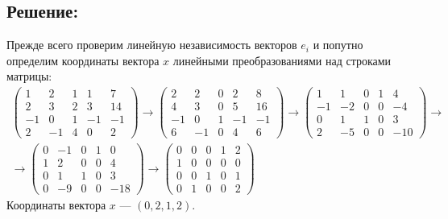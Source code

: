 \documentclass[12pt]{article}
\begin{document}
    \subsection*{Решение:}
    Прежде всего проверим линейную независимость векторов $e_i$ и попутно определим координаты вектора $x$ линейными преобразованиями над строками матрицы:
    \begin{gather*}
        \begin{pmatrix}
            1  & 2  & 1 & 1  & 7  \\
            2  & 3  & 2 & 3  & 14 \\
            -1 & 0  & 1 & -1 & -1 \\
            2  & -1 & 4 & 0  & 2
        \end{pmatrix}
        \rightarrow
        \begin{pmatrix}
            2  & 2  & 0 & 2  & 8  \\
            4  & 3  & 0 & 5  & 16 \\
            -1 & 0  & 1 & -1 & -1 \\
            6  & -1 & 0 & 4  & 6
        \end{pmatrix}
        \rightarrow
        \begin{pmatrix}
            1  & 1  & 0 & 1 & 4   \\
            -1 & -2 & 0 & 0 & -4  \\
            0  & 1  & 1 & 0 & 3   \\
            2  & -5 & 0 & 0 & -10
        \end{pmatrix}
        \rightarrow \\
        \rightarrow
        \begin{pmatrix}
            0 & -1 & 0 & 1 & 0   \\
            1 & 2  & 0 & 0 & 4   \\
            0 & 1  & 1 & 0 & 3   \\
            0 & -9 & 0 & 0 & -18
        \end{pmatrix}
        \rightarrow
        \begin{pmatrix}
            0 & 0 & 0 & 1 & 2 \\
            1 & 0 & 0 & 0 & 0 \\
            0 & 0 & 1 & 0 & 1 \\
            0 & 1 & 0 & 0 & 2
        \end{pmatrix}
    \end{gather*}
    Координаты вектора $x$ --- $\left ( 0, 2, 1, 2 \right )$.
\end{document}
